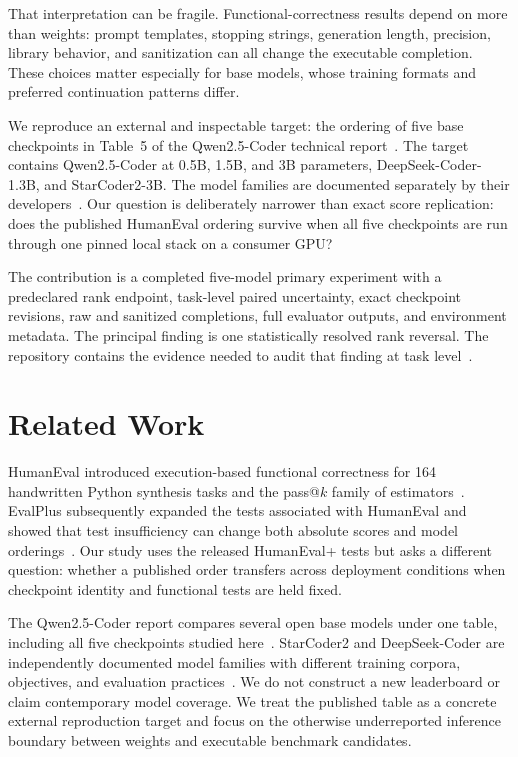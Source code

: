 \documentclass[10pt,twocolumn]{article}
\begin{document}
That interpretation can be fragile. Functional-correctness results depend on more than weights: prompt templates, stopping strings, generation length, precision, library behavior, and sanitization can all change the executable completion. These choices matter especially for base models, whose training formats and preferred continuation patterns differ.

We reproduce an external and inspectable target: the ordering of five base checkpoints in Table~5 of the Qwen2.5-Coder technical report~\citep{hui2024qwen25coder}. The target contains Qwen2.5-Coder at 0.5B, 1.5B, and 3B parameters, DeepSeek-Coder-1.3B, and StarCoder2-3B. The model families are documented separately by their developers~\citep{hui2024qwen25coder,lozhkov2024starcoder2,guo2024deepseekcoder}. Our question is deliberately narrower than exact score replication: does the published HumanEval ordering survive when all five checkpoints are run through one pinned local stack on a consumer GPU?

The contribution is a completed five-model primary experiment with a predeclared rank endpoint, task-level paired uncertainty, exact checkpoint revisions, raw and sanitized completions, full evaluator outputs, and environment metadata. The principal finding is one statistically resolved rank reversal. The repository contains the evidence needed to audit that finding at task level~\citep{bassi2026repository}.

\section{Related Work}

HumanEval introduced execution-based functional correctness for 164 handwritten Python synthesis tasks and the pass@$k$ family of estimators~\citep{chen2021humaneval}. EvalPlus subsequently expanded the tests associated with HumanEval and showed that test insufficiency can change both absolute scores and model orderings~\citep{liu2023evalplus}. Our study uses the released HumanEval+ tests but asks a different question: whether a published order transfers across deployment conditions when checkpoint identity and functional tests are held fixed.

The Qwen2.5-Coder report compares several open base models under one table, including all five checkpoints studied here~\citep{hui2024qwen25coder}. StarCoder2 and DeepSeek-Coder are independently documented model families with different training corpora, objectives, and evaluation practices~\citep{lozhkov2024starcoder2,guo2024deepseekcoder}. We do not construct a new leaderboard or claim contemporary model coverage. We treat the published table as a concrete external reproduction target and focus on the otherwise underreported inference boundary between weights and executable benchmark candidates.
\end{document}

